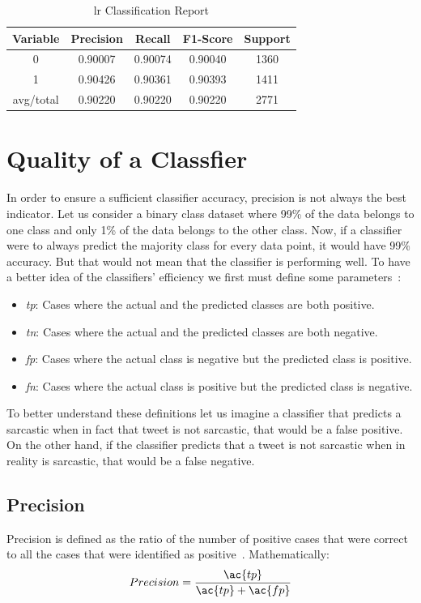 \begin{table}[h!]
	\centering
	\begin{tabular}{||c c c c c||} 
		\hline
		Variable & Precision & Recall & F1-Score & Support \\ [0.5ex] 
		\hline\hline
		0 & 0.90007 & 0.90074 & 0.90040 & 1360 \\ 
		1 & 0.90426 & 0.90361 & 0.90393 & 1411 \\
		avg/total & 0.90220 & 0.90220 & 0.90220 & 2771 \\
		[1ex] 
		\hline
	\end{tabular}
	\caption{\acl{lr} Classification Report}
	\label{tab:lr1}
\end{table}

\section{Quality of a Classfier}
\label{sec:score}
In order to ensure a sufficient classifier accuracy, precision is not always the best indicator. Let us consider a binary class dataset where 99\% of the data belongs to one class and only 1\% of the data belongs to the other class. Now, if a classifier were to always predict the majority class for every data point, it would have 99\% accuracy. But that would not mean that the classifier is performing well. To have a better idea of the classifiers' efficiency we first must define some parameters~\cite{f1score}:
\begin{itemize}
	\item \textit{\acf{tp}}: Cases where the actual and the predicted classes are both positive.
	\item \textit{\acf{tn}}: Cases where the actual and the predicted classes are both negative.
	\item \textit{\acf{fp}}: Cases where the actual class is negative but the predicted class is positive.
	\item \textit{\acf{fn}}: Cases where the actual class is positive but the predicted class is negative.
\end{itemize}
To better understand these definitions let us imagine a classifier that predicts a sarcastic when in fact that tweet is not sarcastic, that would be a false positive. On the other hand, if the classifier predicts that a tweet is not sarcastic when in reality is sarcastic, that would be a false negative.
\subsection{Precision}
Precision is defined as the ratio of the number of positive cases that were correct to all the cases that were identified as positive~\cite{f1score}. Mathematically:
\begin{equation}
Precision = \frac{\ac{tp}}{\ac{tp}+\ac{fp}}
\label{ec:precision}
\end{equation}
